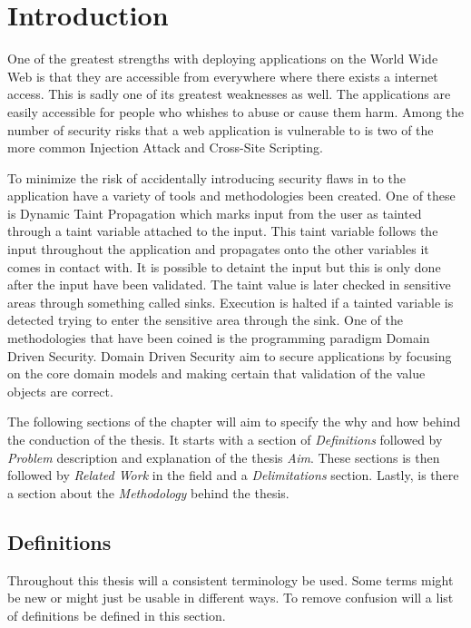 \chapter{Introduction}
One of the greatest strengths with deploying applications on the World Wide Web is that they are accessible from everywhere where there exists a internet access. This is sadly one of its greatest weaknesses as well. The applications are easily accessible for people who whishes to abuse or cause them harm. Among the number of security risks that a web application is vulnerable to is two of the more common Injection Attack and Cross-Site Scripting. \parencite{OpenWebApplicationSecurityProject, CrossMichael2007Dgtw}

To minimize the risk of accidentally introducing security flaws in to the application have a variety of tools and methodologies been created. One of these is Dynamic Taint Propagation which marks input from the user as tainted through a taint variable attached to the input. This taint variable follows the input throughout the application and propagates onto the other variables it comes in contact with. It is possible to detaint the input but this is only done after the input have been validated. The taint value is later checked in sensitive areas through something called sinks. Execution is halted if a tainted variable is detected trying to enter the sensitive area through the sink. \parencite{Pan2015, Venkataramani2008} One of the methodologies that have been coined is the programming paradigm Domain Driven Security. Domain Driven Security aim to secure applications by focusing on the core domain models and making certain that validation of the value objects are correct. \parencite{Wilander2009, Johnsson2009}

The following sections of the chapter will aim to specify the why and how behind the conduction of the thesis. It starts with a section of \textit{Definitions} followed by \textit{Problem} description and explanation of the thesis \textit{Aim}. These sections is then followed by \textit{Related Work} in the field and a \textit{Delimitations} section. Lastly, is there a section about the \textit{Methodology} behind the thesis.


\section{Definitions}
Throughout this thesis will a consistent terminology be used. Some terms might be new or might just be usable in different ways. To remove confusion will a list of definitions be defined in this section.

